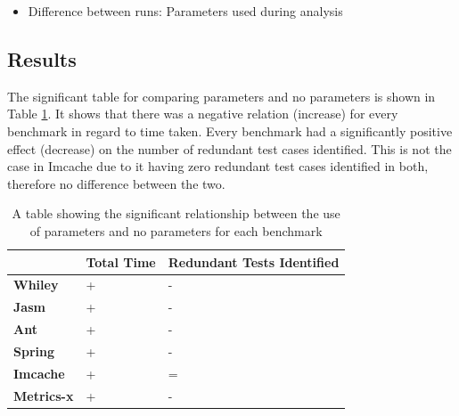 \documentclass[11pt
              , a4paper
              , twoside
              , openright
              ]{report}
\begin{document}
\begin{itemize}
\item Difference between runs: Parameters used during analysis
\end{itemize}

\subsection{Results}
The significant table for comparing parameters and no parameters is shown in Table \ref{parametersig}. It shows that there was a negative relation (increase) for every benchmark in regard to time taken. Every benchmark had a significantly positive effect (decrease) on the number of redundant test cases identified. This is not the case in Imcache due to it having zero redundant test cases identified in both, therefore no difference between the two.

\begin{table}[h]
\centering
\begin{tabular}{|l|l|l|}
\hline
{\bf }          & {\bf Total Time} & {\bf Redundant Tests Identified} \\ \hline
{\bf Whiley}    & +                & -                           \\ \hline
{\bf Jasm}      & +               & -                          \\ \hline
{\bf Ant}       & +                & -                           \\ \hline
{\bf Spring}    & +                & -                           \\ \hline
{\bf Imcache}   & +                & =                           \\ \hline
{\bf Metrics-x} & +                & -                           \\ \hline
\end{tabular}
\caption{A table showing the significant relationship between the use of parameters and no parameters for each benchmark}
\label{parametersig}
\end{table}
\end{document}
